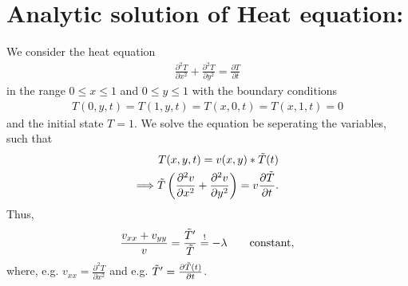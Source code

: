 \documentclass{article}
\begin{document}
\section*{Analytic solution of Heat equation:}
We consider the heat equation
\begin{align}
    \frac{\partial^2 T}{ \partial x ^2} + \frac{\partial^2 T}{ \partial y ^2} = \frac{\partial T}{ \partial t}
\end{align}
in the range $0 \leq x \leq 1$ and  $0 \leq y \leq 1$ with the boundary conditions
\begin{align}
    T(0,y,t) = T(1, y, t) = T(x, 0, t) = T(x, 1, t) = 0
\end{align}
and the initial state $T =1$. We solve the equation be seperating the variables, such that
\begin{align}
    T(x, y, t) = v(x, y) * \Tilde{T}(t) \\
    \Longrightarrow \Tilde{T}\left(\frac{\partial^2 v}{ \partial x ^2} + \frac{\partial^2 v}{ \partial y ^2}  \right) = v \frac{\partial \Tilde{T}}{ \partial t}.
\end{align}
Thus,
\begin{align}
\frac{v_{xx} + v_{yy}}{v} = \frac{\Tilde{T}'}{\Tilde{T}} \overset{!}{=} -\lambda \quad \quad {\rm constant},
\end{align}
where, e.g.  $v_{xx} = \frac{\partial^2 T}{ \partial x ^2}$ and e.g. $\Tilde{T}' = \frac{\partial \Tilde{T}(t)}{\partial t}$.
\end{document}
